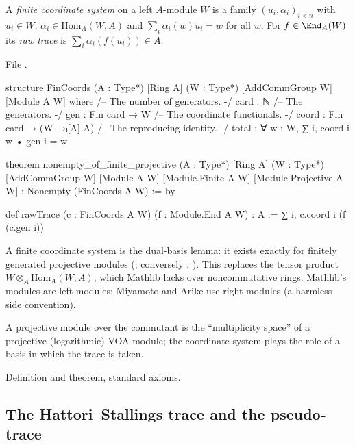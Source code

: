 \begin{definition}\label{l18:def:fincoords}
A \emph{finite coordinate system} on a left $A$-module $W$ is a family $(u_i,\alpha_i)_{i<n}$ with $u_i\in W$,
$\alpha_i\in\mathrm{Hom}_A(W,A)$ and $\sum_i\alpha_i(w)u_i=w$ for all $w$. For $f\in\End_A(W)$ its \emph{raw trace} is
$\sum_i\alpha_i(f(u_i))\in A$.
\end{definition}
\noindent File .
\begin{leancode}
structure FinCoords (A : Type*) [Ring A] (W : Type*) [AddCommGroup W] [Module A W] where
  /-- The number of generators. -/
  card : ℕ
  /-- The generators. -/
  gen : Fin card → W
  /-- The coordinate functionals. -/
  coord : Fin card → (W →ₗ[A] A)
  /-- The reproducing identity. -/
  total : ∀ w : W, ∑ i, coord i w • gen i = w

theorem nonempty_of_finite_projective (A : Type*) [Ring A] (W : Type*) [AddCommGroup W]
    [Module A W] [Module.Finite A W] [Module.Projective A W] : Nonempty (FinCoords A W) := by

def rawTrace (c : FinCoords A W) (f : Module.End A W) : A :=
  ∑ i, c.coord i (f (c.gen i))
\end{leancode}
\begin{dictionary}
A finite coordinate system is the dual-basis lemma: it exists exactly for finitely generated projective modules
(; conversely , ). This
replaces the tensor product $W\otimes_A\mathrm{Hom}_A(W,A)$, which Mathlib lacks over noncommutative rings. Mathlib's
modules are left modules; Miyamoto and Arike use right modules (a harmless side convention).
\end{dictionary}
\begin{physics}
A projective module over the commutant is the ``multiplicity space'' of a projective (logarithmic) VOA-module;
the coordinate system plays the role of a basis in which the trace is taken.
\end{physics}
\begin{status}
Definition and theorem, standard axioms.
\end{status}

\subsection{The Hattori--Stallings trace and the pseudo-trace}

